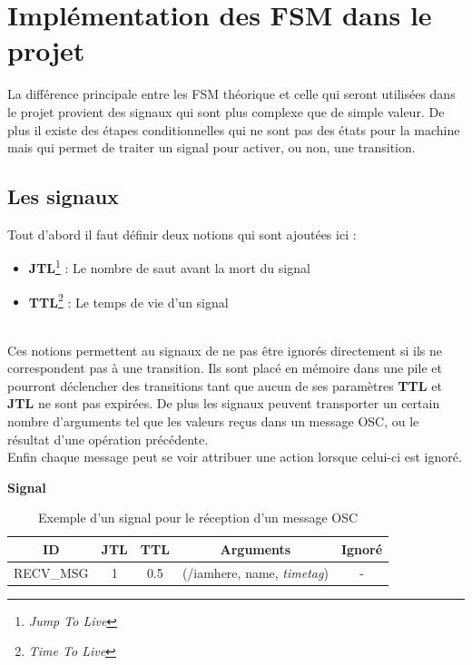 \section{Implémentation des FSM dans le projet}
La différence principale entre les FSM théorique et celle qui seront utilisées dans le projet provient des signaux qui sont plus complexe que de simple valeur.\p
De plus il existe des étapes conditionnelles qui ne sont pas des états pour la machine mais qui permet de traiter un signal pour activer, ou non, une transition.

\subsection{Les signaux}
Tout d'abord il faut définir deux notions qui sont ajoutées ici : 
\begin{itemize}
\item \textbf{JTL}\footnote{\textit{Jump To Live}} : Le nombre de saut avant la mort du signal
\item \textbf{TTL}\footnote{\textit{Time To Live}} : Le temps de vie d'un signal
\end{itemize}~\\
\indent Ces notions permettent au signaux de ne pas être ignorés directement si ils ne correspondent pas à une transition. Ils sont placé en mémoire dans une pile et pourront déclencher des transitions tant que aucun de ses paramètres \textbf{TTL} et \textbf{JTL} ne sont pas expirées.\p
De plus les signaux peuvent transporter un certain nombre d'arguments tel que les valeurs reçus dans un message OSC, ou le résultat d'une opération précédente.\\
Enfin chaque message peut se voir attribuer une action lorsque celui-ci est ignoré.

\begin{table}[htbp]
\centering

\textbf{Signal}\vspace{8pt}~\\

\begin{tabularx}{0.95\textwidth}{|c|c|c|C|c|}
\hline
\textbf{ID} & \textbf{JTL} & \textbf{TTL} & \textbf{Arguments} & \textbf{Ignoré}  \tabularnewline
\hline
\hline
RECV\_MSG & 1 & 0.5 & (/iamhere, name, \textit{timetag}) & - \tabularnewline
\hline
\end{tabularx}
\vspace{10pt} 
\label{tab:sig_exemple}
\caption{Exemple d'un signal pour le réception d'un message OSC}
\end{table}

